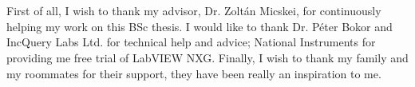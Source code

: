 \chapter*{\koszonetnyilvanitas}



First of all, I wish to thank my advisor, Dr. Zoltán Micskei, for continuously helping my work on this BSc thesis. I would like to thank Dr. Péter Bokor and IncQuery Labs Ltd. for technical help and advice; National Instruments for providing me free trial of LabVIEW NXG. Finally, I wish to thank my family and my roommates for their support, they have been really an inspiration to me.